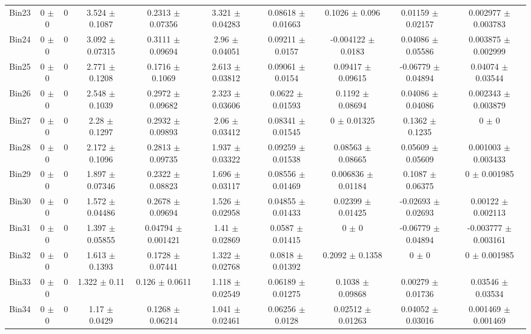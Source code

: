 \begin{tabular}{@{\extracolsep{4pt}}lccccccccc@{}}
     Bin23 & 0 $\pm$ 0 & 0 & 3.524 $\pm$ 0.1087 & 0.2313 $\pm$ 0.07356 & 3.321 $\pm$ 0.04283 & 0.08618 $\pm$ 0.01663 & 0.1026 $\pm$ 0.096 & 0.01159 $\pm$ 0.02157 & 0.002977 $\pm$ 0.003783 \\ 
     Bin24 & 0 $\pm$ 0 & 0 & 3.092 $\pm$ 0.07315 & 0.3111 $\pm$ 0.09694 & 2.96 $\pm$ 0.04051 & 0.09211 $\pm$ 0.0157 & -0.004122 $\pm$ 0.0183 & 0.04086 $\pm$ 0.05586 & 0.003875 $\pm$ 0.002999 \\ 
     Bin25 & 0 $\pm$ 0 & 0 & 2.771 $\pm$ 0.1208 & 0.1716 $\pm$ 0.1069 & 2.613 $\pm$ 0.03812 & 0.09061 $\pm$ 0.0154 & 0.09417 $\pm$ 0.09615 & -0.06779 $\pm$ 0.04894 & 0.04074 $\pm$ 0.03544 \\ 
     Bin26 & 0 $\pm$ 0 & 0 & 2.548 $\pm$ 0.1039 & 0.2972 $\pm$ 0.09682 & 2.323 $\pm$ 0.03606 & 0.0622 $\pm$ 0.01593 & 0.1192 $\pm$ 0.08694 & 0.04086 $\pm$ 0.04086 & 0.002343 $\pm$ 0.003879 \\ 
     Bin27 & 0 $\pm$ 0 & 0 & 2.28 $\pm$ 0.1297 & 0.2932 $\pm$ 0.09893 & 2.06 $\pm$ 0.03412 & 0.08341 $\pm$ 0.01545 & 0 $\pm$ 0.01325 & 0.1362 $\pm$ 0.1235 & 0 $\pm$ 0 \\ 
     Bin28 & 0 $\pm$ 0 & 0 & 2.172 $\pm$ 0.1096 & 0.2813 $\pm$ 0.09735 & 1.937 $\pm$ 0.03322 & 0.09259 $\pm$ 0.01538 & 0.08563 $\pm$ 0.08665 & 0.05609 $\pm$ 0.05609 & 0.001003 $\pm$ 0.003433 \\ 
     Bin29 & 0 $\pm$ 0 & 0 & 1.897 $\pm$ 0.07346 & 0.2322 $\pm$ 0.08823 & 1.696 $\pm$ 0.03117 & 0.08556 $\pm$ 0.01469 & 0.006836 $\pm$ 0.01184 & 0.1087 $\pm$ 0.06375 & 0 $\pm$ 0.001985 \\ 
     Bin30 & 0 $\pm$ 0 & 0 & 1.572 $\pm$ 0.04486 & 0.2678 $\pm$ 0.09694 & 1.526 $\pm$ 0.02958 & 0.04855 $\pm$ 0.01433 & 0.02399 $\pm$ 0.01425 & -0.02693 $\pm$ 0.02693 & 0.00122 $\pm$ 0.002113 \\ 
     Bin31 & 0 $\pm$ 0 & 0 & 1.397 $\pm$ 0.05855 & 0.04794 $\pm$ 0.001421 & 1.41 $\pm$ 0.02869 & 0.0587 $\pm$ 0.01415 & 0 $\pm$ 0 & -0.06779 $\pm$ 0.04894 & -0.003777 $\pm$ 0.003161 \\ 
     Bin32 & 0 $\pm$ 0 & 0 & 1.613 $\pm$ 0.1393 & 0.1728 $\pm$ 0.07441 & 1.322 $\pm$ 0.02768 & 0.0818 $\pm$ 0.01392 & 0.2092 $\pm$ 0.1358 & 0 $\pm$ 0 & 0 $\pm$ 0.001985 \\ 
     Bin33 & 0 $\pm$ 0 & 0 & 1.322 $\pm$ 0.11 & 0.126 $\pm$ 0.0611 & 1.118 $\pm$ 0.02549 & 0.06189 $\pm$ 0.01275 & 0.1038 $\pm$ 0.09868 & 0.00279 $\pm$ 0.01736 & 0.03546 $\pm$ 0.03534 \\ 
     Bin34 & 0 $\pm$ 0 & 0 & 1.17 $\pm$ 0.0429 & 0.1268 $\pm$ 0.06214 & 1.041 $\pm$ 0.02461 & 0.06256 $\pm$ 0.0128 & 0.02512 $\pm$ 0.01263 & 0.04052 $\pm$ 0.03016 & 0.001469 $\pm$ 0.001469 \\ 

\end{tabular}

